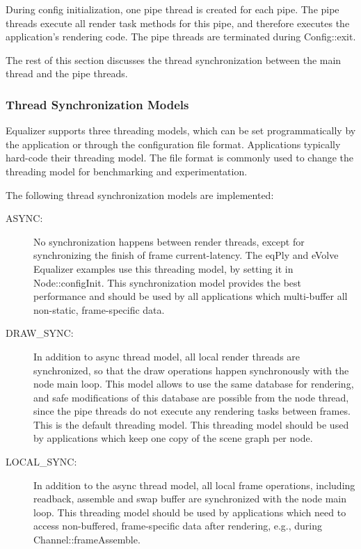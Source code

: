 \documentclass[10pt,a4]{scrartcl}
\begin{document}
During config initialization, one pipe thread is created for each
pipe. The pipe threads execute all render task methods for this pipe,
and therefore executes the application's rendering code. The pipe
threads are terminated during \textsf{Config::exit}.

The rest of this section discusses the thread synchronization between
the main thread and the pipe threads.


\subsubsection{\label{sThreadModel}Thread Synchronization Models}
Equalizer supports three threading models, which can be set
programmatically by the application or through the configuration file
format. Applications typically hard-code their threading model. The file
format is commonly used to change the threading model for benchmarking
and experimentation.

The following thread synchronization models are implemented:
\begin{description}
\item[ASYNC:] No synchronization happens between render threads, except
  for synchronizing the finish of frame \textsf{current-latency}. The
  \textsf{eqPly} and \textsf{eVolve} Equalizer examples use this
  threading model, by setting it in \textsf{Node::configInit}. This
  synchronization model provides the best performance and should be used
  by all applications which multi-buffer all non-static, frame-specific
  data.
\item[DRAW\_SYNC:] In addition to async thread model, all local render
  threads are synchronized, so that the draw operations happen
  synchronously with the node main loop. This model allows to use the
  same database for rendering, and safe modifications of this database
  are possible from the node thread, since the pipe threads do not
  execute any rendering tasks between frames. This is the default
  threading model. This threading model should be used by applications
  which keep one copy of the scene graph per node.
\item[LOCAL\_SYNC:] In addition to the async thread model, all local
  frame operations, including readback, assemble and swap buffer are
  synchronized with the node main loop. This threading model should be
  used by applications which need to access non-buffered, frame-specific
  data after rendering, e.g., during \textsf{Channel::frameAssemble}.
\end{description}
\end{document}
